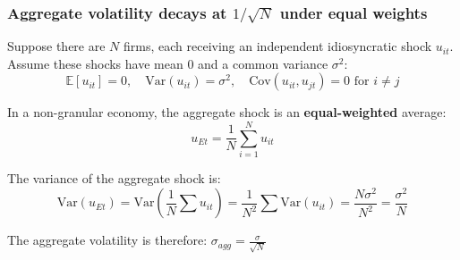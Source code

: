 \documentclass[aspectratio=169,11pt]{beamer}
\begin{document}
\begin{frame}
    \label{app_sqrtn}
    \frametitle{Aggregate volatility decays at $1/\sqrt{N}$ under equal weights}

    \vspace{0.4cm}
    Suppose there are $N$ firms, each receiving an independent idiosyncratic shock $u_{it}$.
    Assume these shocks have mean 0 and a common variance $\sigma^2$:
    \begin{equation*}
        \mathbb{E}[u_{it}] = 0, \quad \text{Var}(u_{it}) = \sigma^2, \quad \text{Cov}(u_{it}, u_{jt}) = 0 \text{ for } i \neq j
    \end{equation*}

    \vspace{0.4cm}
    In a non-granular economy, the aggregate shock is an \textbf{equal-weighted} average:
    \begin{equation*}
        u_{Et} = \frac{1}{N} \sum_{i=1}^N u_{it}
    \end{equation*}

    \vspace{0.4cm}
    The variance of the aggregate shock is:
    \begin{equation*}
        \text{Var}(u_{Et}) = \text{Var}\left( \frac{1}{N} \sum u_{it} \right) = \frac{1}{N^2} \sum \text{Var}(u_{it}) = \frac{N \sigma^2}{N^2} =
        \frac{\sigma^2}{N}
    \end{equation*}

    {
    The aggregate volatility is therefore: { $\sigma_{agg} = \frac{\sigma}{\sqrt{N}}$}
    }

    \vspace{0.1cm}
    \hfill \hyperlink{src_sqrtn}{}
\end{frame}
\end{document}
